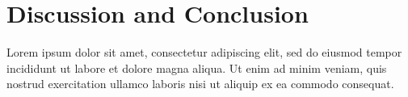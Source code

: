 \chapter[Discussion and Conclusion]{Discussion and Conclusion} \label{ch:discuss-conc}

Lorem ipsum dolor sit amet, consectetur adipiscing elit, sed do eiusmod tempor incididunt ut labore et dolore magna aliqua. Ut enim ad minim veniam, quis nostrud exercitation ullamco laboris nisi ut aliquip ex ea commodo consequat.

